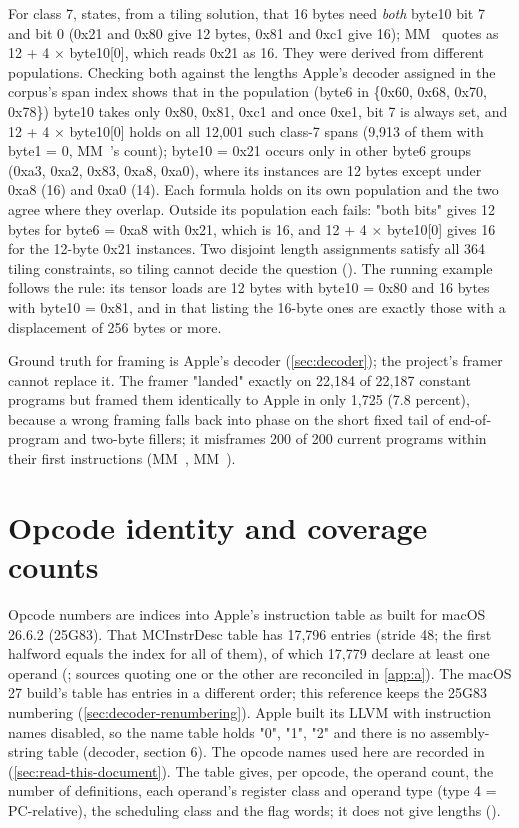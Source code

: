 For class 7,  states, from a tiling solution, that 16 bytes need \emph{both} byte10
bit 7 and bit 0 (0x21 and 0x80 give 12 bytes, 0x81 and 0xc1 give 16); MM~ quotes  as 12 + 4 × byte10{[}0{]}, which
reads 0x21 as 16. They were derived from different populations. Checking both against the lengths Apple's decoder assigned in the
corpus's span index shows that in the  population (byte6 in \{0x60, 0x68, 0x70, 0x78\}) byte10 takes only 0x80, 0x81, 0xc1 and once
0xe1, bit 7 is always set, and 12 + 4 × byte10{[}0{]} holds on all 12,001 such class-7 spans (9,913 of them with byte1 = 0,
MM~'s count); byte10 = 0x21 occurs only in other byte6 groups (0xa3, 0xa2, 0x83, 0xa8, 0xa0), where its instances are
12 bytes except under 0xa8 (16) and 0xa0 (14). Each formula holds on its own population and the two agree where they
overlap. Outside its population each fails: "both bits" gives 12 bytes for byte6 = 0xa8 with 0x21, which is 16, and
12 + 4 × byte10{[}0{]} gives 16 for the 12-byte 0x21 instances. Two disjoint length assignments satisfy all 364 tiling
constraints, so tiling cannot decide the question (). The running
example follows the  rule: its tensor loads are 12 bytes with byte10 = 0x80 and 16 bytes with byte10 = 0x81, and in that
listing the 16-byte ones are exactly those with a displacement of 256 bytes or more.

Ground truth for framing is Apple's decoder (\cref{sec:decoder}); the project's framer cannot replace it. The framer "landed" exactly on
22,184 of 22,187 constant programs but framed them identically to Apple in only 1,725 (7.8 percent), because a wrong
framing falls back into phase on the short fixed tail of end-of-program and two-byte fillers; it misframes 200 of 200
current programs within their first instructions (MM~, MM~).

\section{Opcode identity and coverage counts}\label{sec:opcode-identity-counts}

Opcode numbers are indices into Apple's instruction table as built for macOS 26.6.2 (25G83). That MCInstrDesc table has
17,796 entries (stride 48; the first halfword equals the index for all of them), of which 17,779 declare at least one
operand (; sources quoting one or the other are reconciled in \cref{app:a}). The macOS 27
build's table has  entries in a different order; this reference keeps the 25G83 numbering
(\cref{sec:decoder-renumbering}). Apple built its LLVM with instruction names disabled, so the name table holds
"0", "1", "2" and there is no assembly-string table (decoder,  section 6). The opcode names used
here are recorded in  (\cref{sec:read-this-document}).
The table gives, per opcode, the operand count, the number of definitions, each operand's register class and operand
type (type 4 = PC-relative), the scheduling class and the flag words; it does not give lengths
().

